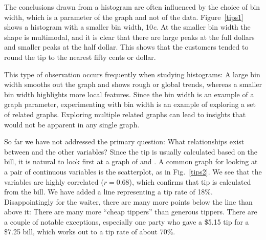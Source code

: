 The conclusions drawn from a histogram are often influenced by the
choice of bin width, which is a parameter of the graph and not of the
data.  Figure~\ref{tips1} shows a histogram with a smaller bin width,
10{\it c}.  At the smaller bin width the shape is multimodal, and it is
clear that there are large peaks at the full dollars and smaller peaks
at the half dollar.  This shows that the customers tended to round the
tip to the nearest fifty cents or dollar.

This type of observation occurs frequently when studying histograms: A
large bin width smooths out the graph and shows rough or global
trends, whereas a smaller bin width highlights more local features.
Since the bin width is an example of a graph parameter, experimenting
with bin width is an example of exploring a set of related graphs.
Exploring multiple related graphs can lead to insights that would not
be apparent in any single graph.

 So far we have not addressed the primary question:
What relationships exist between  and the other variables?
Since the tip is usually calculated based on the bill, it is natural
to look first at a graph of  and .  A common graph
for looking at a pair of continuous variables is the scatterplot, as
in Fig.~\ref{tips2}.  We see that the variables are highly correlated
($r=0.68$), which confirms that tip is calculated from the bill.  We
have added a line representing a tip rate of 18\%.  Disappointingly
for the waiter, there are many more points below the line than above
it: There are many more ``cheap tippers'' than generous tippers.
There are a couple of notable exceptions, especially one party who
gave a \${5.15} tip for a \${7.25} bill, which works out to a tip rate
of about 70\%.


